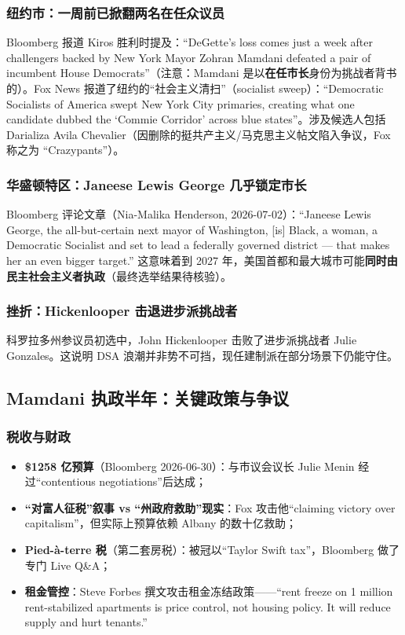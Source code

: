 \documentclass[12pt,a4paper]{ctexart}
\begin{document}
\subsubsection{纽约市：一周前已掀翻两名在任众议员}

Bloomberg 报道 Kiros 胜利时提及：``DeGette's loss comes just a week after challengers backed by New York Mayor Zohran Mamdani defeated a pair of incumbent House Democrats''（注意：Mamdani 是以\textbf{在任市长}身份为挑战者背书的）。Fox News 报道了纽约的``社会主义清扫''（socialist sweep）：``Democratic Socialists of America swept New York City primaries, creating what one candidate dubbed the `Commie Corridor' across blue states''。涉及候选人包括 Darializa Avila Chevalier（因删除的挺共产主义/马克思主义帖文陷入争议，Fox 称之为 ``Crazypants''）。

\subsubsection{华盛顿特区：Janeese Lewis George 几乎锁定市长}

Bloomberg 评论文章（Nia-Malika Henderson, 2026-07-02）：``Janeese Lewis George, the all-but-certain next mayor of Washington, [is] Black, a woman, a Democratic Socialist and set to lead a federally governed district — that makes her an even bigger target.'' 这意味着到 2027 年，美国首都和最大城市可能\textbf{同时由民主社会主义者执政}（最终选举结果待核验）。

\subsubsection{挫折：Hickenlooper 击退进步派挑战者}

科罗拉多州参议员初选中，John Hickenlooper 击败了进步派挑战者 Julie Gonzales。这说明 DSA 浪潮并非势不可挡，现任建制派在部分场景下仍能守住。

\subsection{Mamdani 执政半年：关键政策与争议}

\subsubsection{税收与财政}

\begin{itemize}
  \item \textbf{\$1258 亿预算}（Bloomberg 2026-06-30）：与市议会议长 Julie Menin 经过``contentious negotiations''后达成；
  \item \textbf{``对富人征税''叙事 vs ``州政府救助''现实}：Fox 攻击他``claiming victory over capitalism''，但实际上预算依赖 Albany 的数十亿救助；
  \item \textbf{Pied-à-terre 税}（第二套房税）：被冠以``Taylor Swift tax''，Bloomberg 做了专门 Live Q\&A；
  \item \textbf{租金管控}：Steve Forbes 撰文攻击租金冻结政策——``rent freeze on 1 million rent-stabilized apartments is price control, not housing policy. It will reduce supply and hurt tenants.''
\end{itemize}
\end{document}

